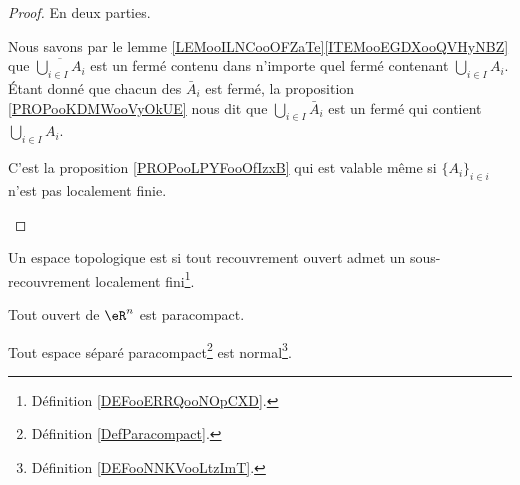 \begin{proof}
	En deux parties.
	\begin{subproof}
		Nous savons par le lemme \ref{LEMooILNCooOFZaTe}\ref{ITEMooEGDXooQVHyNBZ} que \( \overline{\bigcup_{i\in I}A_i}\) est un fermé contenu dans n'importe quel fermé contenant \( \bigcup_{i\in I}A_i\). Étant donné que chacun des \( \bar A_i\) est fermé, la proposition \ref{PROPooKDMWooVyOkUE} nous dit que \( \bigcup_{i\in I}\bar A_i\) est un fermé qui contient \( \bigcup_{i\in I}A_i\).

		C'est la proposition \ref{PROPooLPYFooOfIzxB} qui est valable même si \( \{ A_i \}_{i\in i}\) n'est pas localement finie.
	\end{subproof}
\end{proof}

\begin{definition}	\label{DefParacompact}
	Un espace topologique est  si tout recouvrement ouvert admet un sous-recouvrement localement fini\footnote{Définition \ref{DEFooERRQooNOpCXD}.}.
\end{definition}

\begin{proposition}	\label{PROPooLFPXooUBytkm}
	Tout ouvert de \( \eR^n\) est paracompact.
\end{proposition}

\begin{proposition}	\label{PROPooJOYRooSIIDtK}
	Tout espace séparé paracompact\footnote{Définition \ref{DefParacompact}.} est normal\footnote{Définition \ref{DEFooNNKVooLtzImT}.}.
\end{proposition}


